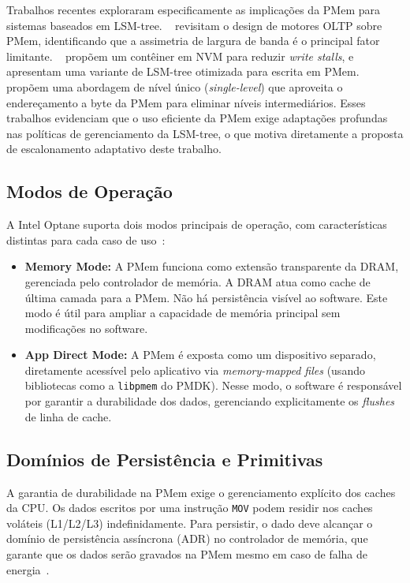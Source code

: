 Trabalhos recentes exploraram especificamente as implicações da PMem para sistemas
baseados em LSM-tree. \citeauthor{revisting_design_lsm}~\cite{revisting_design_lsm}
revisitam o design de motores OLTP sobre PMem, identificando que a assimetria de
largura de banda é o principal fator limitante. \citeauthor{MatrixKV}~\cite{MatrixKV}
propõem um contêiner em NVM para reduzir \textit{write stalls}, e
\citeauthor{FlatLSM}~\cite{FlatLSM} apresentam uma variante de LSM-tree otimizada
para escrita em PMem. \citeauthor{SLM-DB}~\cite{SLM-DB} propõem uma abordagem de
nível único (\textit{single-level}) que aproveita o endereçamento a byte da PMem
para eliminar níveis intermediários. Esses trabalhos evidenciam que o uso eficiente
da PMem exige adaptações profundas nas políticas de gerenciamento da LSM-tree, o que motiva diretamente a proposta de escalonamento adaptativo deste trabalho.

\subsection*{Modos de Operação}

A Intel Optane suporta dois modos principais de operação, com características
distintas para cada caso de uso~\cite{van_renen_2020}:

\begin{itemize}
    \item \textbf{Memory Mode:} A PMem funciona como extensão transparente da
    DRAM, gerenciada pelo controlador de memória. A DRAM atua como cache de
    última camada para a PMem. Não há persistência visível ao software. Este modo
    é útil para ampliar a capacidade de memória principal sem modificações no
    software.

    \item \textbf{App Direct Mode:} A PMem é exposta como um dispositivo separado,
    diretamente acessível pelo aplicativo via \textit{memory-mapped files} (usando
    bibliotecas como a \texttt{libpmem} do PMDK). Nesse modo, o software é
    responsável por garantir a durabilidade dos dados, gerenciando explicitamente
    os \textit{flushes} de linha de cache.
\end{itemize}

\subsection*{Domínios de Persistência e Primitivas}

A garantia de durabilidade na PMem exige o gerenciamento explícito dos caches da
CPU. Os dados escritos por uma instrução \texttt{MOV} podem residir nos caches
voláteis (L1/L2/L3) indefinidamente. Para persistir, o dado deve alcançar o
domínio de persistência assíncrona (ADR) no controlador de memória, que garante
que os dados serão gravados na PMem mesmo em caso de falha de
energia~\cite{van_renen_2020}.


